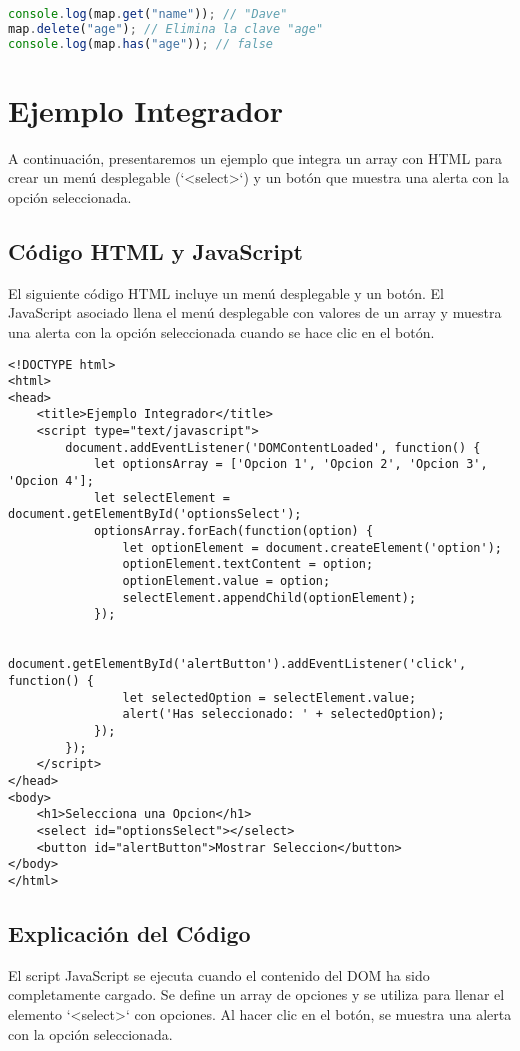 \documentclass{book}
\begin{document}
\begin{lstlisting}[language=JavaScript]
console.log(map.get("name")); // "Dave"
map.delete("age"); // Elimina la clave "age"
console.log(map.has("age")); // false
\end{lstlisting}

\section{Ejemplo Integrador}
A continuación, presentaremos un ejemplo que integra un array con HTML para crear un menú desplegable (`<select>`) y un botón que muestra una alerta con la opción seleccionada.

\subsection{Código HTML y JavaScript}
El siguiente código HTML incluye un menú desplegable y un botón. El JavaScript asociado llena el menú desplegable con valores de un array y muestra una alerta con la opción seleccionada cuando se hace clic en el botón.

\begin{lstlisting}[language=HTML5]
<!DOCTYPE html>
<html>
<head>
    <title>Ejemplo Integrador</title>
    <script type="text/javascript">
        document.addEventListener('DOMContentLoaded', function() {
            let optionsArray = ['Opcion 1', 'Opcion 2', 'Opcion 3', 'Opcion 4'];
            let selectElement = document.getElementById('optionsSelect');
            optionsArray.forEach(function(option) {
                let optionElement = document.createElement('option');
                optionElement.textContent = option;
                optionElement.value = option;
                selectElement.appendChild(optionElement);
            });

            document.getElementById('alertButton').addEventListener('click', function() {
                let selectedOption = selectElement.value;
                alert('Has seleccionado: ' + selectedOption);
            });
        });
    </script>
</head>
<body>
    <h1>Selecciona una Opcion</h1>
    <select id="optionsSelect"></select>
    <button id="alertButton">Mostrar Seleccion</button>
</body>
</html>
\end{lstlisting}

\subsection{Explicación del Código}
El script JavaScript se ejecuta cuando el contenido del DOM ha sido completamente cargado. Se define un array de opciones y se utiliza para llenar el elemento `<select>` con opciones. Al hacer clic en el botón, se muestra una alerta con la opción seleccionada.
\end{document}
